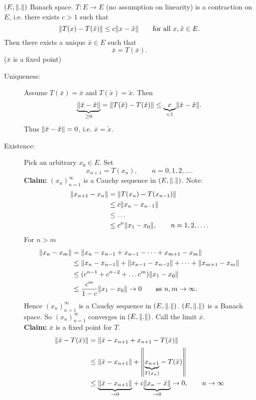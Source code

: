 \begin{theorem}
	$(E, \norm{.})$ Banach space. $T: E \to E$ (no assumption on linearity) is a contraction on $E$, i.e. there exists $c>1$ such that
	\[
		\norm{T(x)-T(\tilde x)} \leq c \norm{x- \tilde x} \qquad \text{for all }x,\tilde x \in E.
	\]
	Then there exists a unique $ \bar{x} \in E$ such that 
	\[
		\bar{x} = T( \bar{ x}).
	\]
	($\bar{x}$ is a fixed point)
\end{theorem}
\begin{beweis}
	\begin{description}
		\item[Uniqueness:]Assume $T( \bar{x}) = \bar{x}$ and $T ( \tilde x) = \tilde x$. Then
		\[
			\underset{\geq 0}{\underbrace{\norm{ \bar{ x} - \tilde x }}} = \norm{T( \bar{x})- T( \tilde x)} \leq \underset{< 1}{\underbrace{c}} \norm{ \bar{x}- \tilde x}.
		\] 
		Thus $\norm{\bar{x}- \tilde x} = 0$, i.e. $\bar{x} = \tilde x$.
		\item[Existence:] Pick an arbitrary $x_0 \in E$. Set
		\[
			x_{n+1} = T(x_{n}), \qquad n=0,1,2,\dots.
		\]
		\textbf{Claim:} \text{    }     $(x_n)_{n=1}^{\infty}$ is a Cauchy sequence in $(E,\norm{.})$.
		Note:
		\begin{align*}
			\norm{x_{n+1}-x_n}  &= \norm{T(x_n)-T(x_{n-1})} \\
			&\leq  c \norm{x_n - x_{n-1}} \\
			&\leq \dots \\
			&\leq  c^n \norm{x_1-x_0}, \qquad n=1,2,\dots.
		\end{align*}
		For $n>m$
		\begin{align*}
			\norm{x_n-x_m} &= \norm{x_n - x_{n-1}+ x_{n-1}- \dots + x_{m+1}- x_m} \\
			&\leq \norm{x_n - x_{n-1}} + \norm{x_{n-1} - x_{n-2}} + \dots + \norm{x_{m+1}- x_m} \\
			&\leq (c^{n-1}+ c^{n-2} + \dots c^m) \norm{x_1-x_0} \\
			&\leq \frac{c^m}{1-c} \norm{x_1 - x_0} \to 0 \qquad \text{as }n,m \to \infty.
		\end{align*}
		Hence $(x_n)_{n=1}^{\infty}$ is a Cauchy sequence in $(E,\norm{.})$. $(E, \norm{.})$ is a Banach space. So $(x_n)_{n=1}^{\infty}$ converges in $(E,\norm{.})$. Call the limit $\bar{x}$. \\
		\textbf{Claim:} \text{    }     $\bar{x}$ is a fixed point for $T$. 
		\begin{align*}
			\norm{\bar{ x}- T(\bar{x})} & = \norm{\bar{x}-x_{n+1}+ x_{n+1} - T(\bar{x})} \\
			&\leq \norm{\bar{x}-x_{n+1}} + \norm{\underset{T(x_n)}{\underbrace{x_{n+1}}} - T(\bar{x})} \\
			&\leq \underset{\to 0}{\underbrace{\norm{\bar{x}- x_{n+1}}}} + c \underset{\to 0}{\underbrace{\norm{x_n - \bar{x}}}} \to 0, \qquad n \to \infty
		\end{align*}
	\end{description}
\end{beweis}
